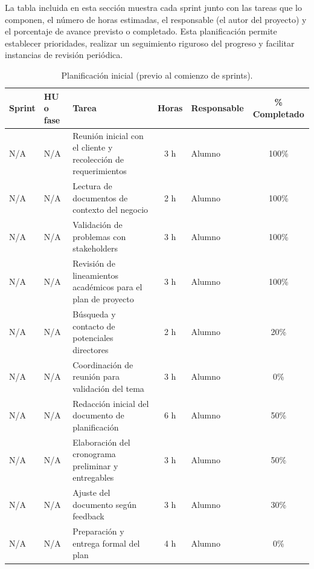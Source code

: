 \documentclass[
11pt, %
]{charter}
\begin{document}
La tabla incluida en esta sección muestra cada sprint junto con las tareas que lo componen, el número de horas estimadas, el responsable (el autor del proyecto) y el porcentaje de avance previsto o completado. Esta planificación permite establecer prioridades, realizar un seguimiento riguroso del progreso y facilitar instancias de revisión periódica.

\begin{table}[htpb]
\centering
\caption{Planificación inicial (previo al comienzo de sprints).}
\begin{tabularx}{\linewidth}{@{}|l|l|X|c|l|c|@{}}
\hline
\rowcolor[HTML]{C0C0C0}
Sprint & HU o fase & Tarea & Horas & Responsable & \% Completado \\ \hline
N/A & N/A & Reunión inicial con el cliente y recolección de requerimientos & 3 h & Alumno & 100\% \\ \hline
N/A & N/A & Lectura de documentos de contexto del negocio & 2 h & Alumno & 100\% \\ \hline
N/A & N/A & Validación de problemas con stakeholders & 3 h & Alumno & 100\% \\ \hline
N/A & N/A & Revisión de lineamientos académicos para el plan de proyecto & 3 h & Alumno & 100\% \\ \hline
N/A & N/A & Búsqueda y contacto de potenciales directores & 2 h & Alumno & 20\% \\ \hline
N/A & N/A & Coordinación de reunión para validación del tema & 3 h & Alumno & 0\% \\ \hline
N/A & N/A & Redacción inicial del documento de planificación & 6 h & Alumno & 50\% \\ \hline
N/A & N/A & Elaboración del cronograma preliminar y entregables & 3 h & Alumno & 50\% \\ \hline
N/A & N/A & Ajuste del documento según feedback & 3 h & Alumno & 30\% \\ \hline
N/A & N/A & Preparación y entrega formal del plan & 4 h & Alumno & 0\% \\ \hline
\end{tabularx}
\end{table}
\end{document}
